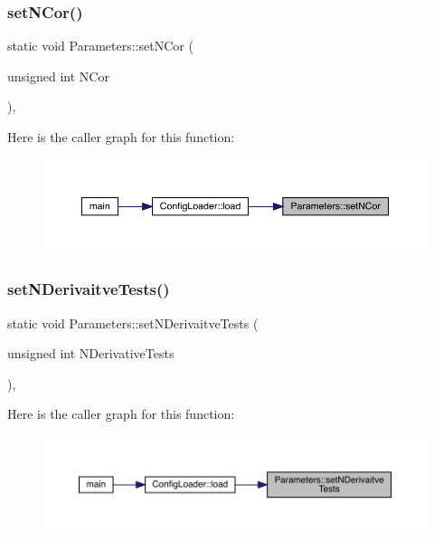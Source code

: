 \subsubsection{\texorpdfstring{setNCor()}{setNCor()}}
{\footnotesize\ttfamily static void Parameters\+::set\+N\+Cor (\begin{DoxyParamCaption}\item[{unsigned int}]{N\+Cor }\end{DoxyParamCaption})\hspace{0.3cm}{\ttfamily [inline]}, {\ttfamily [static]}}

Here is the caller graph for this function\+:
\nopagebreak
\begin{figure}[H]
\begin{center}
\leavevmode
\includegraphics[width=350pt]{class_parameters_afb3ef2dca9d24511a1904bc313fd8513_icgraph}
\end{center}
\end{figure}
\mbox{\label{class_parameters_ae924eabec82bfe600eda893c6f71b00e}} 
\subsubsection{\texorpdfstring{setNDerivaitveTests()}{setNDerivaitveTests()}}
{\footnotesize\ttfamily static void Parameters\+::set\+N\+Derivaitve\+Tests (\begin{DoxyParamCaption}\item[{unsigned int}]{N\+Derivative\+Tests }\end{DoxyParamCaption})\hspace{0.3cm}{\ttfamily [inline]}, {\ttfamily [static]}}

Here is the caller graph for this function\+:
\nopagebreak
\begin{figure}[H]
\begin{center}
\leavevmode
\includegraphics[width=350pt]{class_parameters_ae924eabec82bfe600eda893c6f71b00e_icgraph}
\end{center}
\end{figure}
\mbox{\label{class_parameters_a5cbf802e3e5db24cf0b8afc3f39f0830}} 
